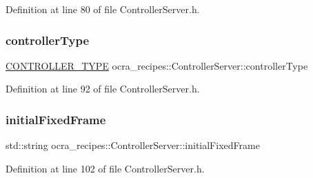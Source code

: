 Definition at line 80 of file Controller\+Server.\+h.

\hypertarget{classocra__recipes_1_1ControllerServer_aaf53114a96960a3cb81577378c179411}{}\label{classocra__recipes_1_1ControllerServer_aaf53114a96960a3cb81577378c179411} 
\subsubsection{\texorpdfstring{controller\+Type}{controllerType}}
{\footnotesize\ttfamily \hyperlink{namespaceocra__recipes_ae561cff4ea9a191b8b1ebb4e69a1a4ba}{C\+O\+N\+T\+R\+O\+L\+L\+E\+R\+\_\+\+T\+Y\+PE} ocra\+\_\+recipes\+::\+Controller\+Server\+::controller\+Type\hspace{0.3cm}{\ttfamily [protected]}}



Definition at line 92 of file Controller\+Server.\+h.

\hypertarget{classocra__recipes_1_1ControllerServer_a93ffe0eff924223989db0ae6fcafaca2}{}\label{classocra__recipes_1_1ControllerServer_a93ffe0eff924223989db0ae6fcafaca2} 
\subsubsection{\texorpdfstring{initial\+Fixed\+Frame}{initialFixedFrame}}
{\footnotesize\ttfamily std\+::string ocra\+\_\+recipes\+::\+Controller\+Server\+::initial\+Fixed\+Frame\hspace{0.3cm}{\ttfamily [protected]}}



Definition at line 102 of file Controller\+Server.\+h.

\hypertarget{classocra__recipes_1_1ControllerServer_a46e53b5a5bf9f7d55af477f85cb21522}{}\label{classocra__recipes_1_1ControllerServer_a46e53b5a5bf9f7d55af477f85cb21522} 
